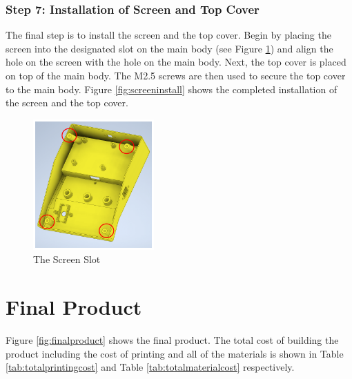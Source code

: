 
\subsubsection{Step 7: Installation of Screen and Top Cover}

The final step is to install the screen and the top cover. Begin by placing the screen into the designated slot on the main body (see Figure \ref{fig:screenslot}) and align the hole on the screen with the hole on the main body. Next, the top cover is placed on top of the main body. The M2.5 screws are then used to secure the top cover to the main body. Figure \ref{fig:screeninstall} shows the completed installation of the screen and the top cover.

\begin{figure}
    \centering
    \includegraphics[height=5cm]{texs/Part1/chapter5/image/screenslot.png}
    \caption{The Screen Slot}
    \label{fig:screenslot}
\end{figure}


\section{Final Product}
\label{sec:finalproduct}

Figure \ref{fig:finalproduct} shows the final product. The total cost of building the product including the cost of printing and all of the materials is shown in Table \ref{tab:totalprintingcost} and Table \ref{tab:totalmaterialcost} respectively.

